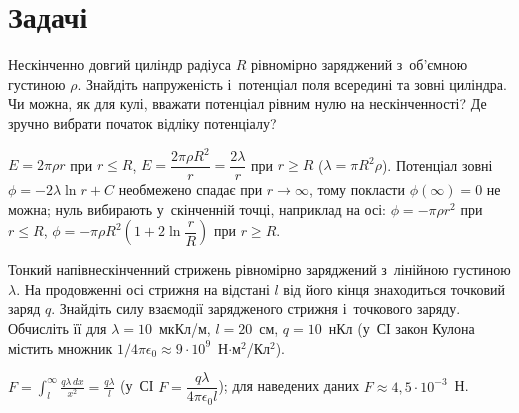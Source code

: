 \section*{Задачі}



 {}


\begin{problem}\label{prb:CylinderPotential}%
	Нескінченно довгий циліндр радіуса $R$ рівномірно заряджений з~об'ємною густиною
	$\rho$. Знайдіть напруженість і~потенціал поля всередині та зовні циліндра. Чи можна,
	як для кулі, вважати потенціал рівним нулю на нескінченності? Де зручно вибрати
	початок відліку потенціалу?
	\begin{solution}
		$E = 2\pi\rho r$ при $r\leqslant R$, $E = \dfrac{2\pi\rho R^2}{r} = \dfrac{2\lambda}{r}$ при $r\geqslant R$ ($\lambda=\pi R^2\rho$). Потенціал зовні $\phi = -2\lambda\ln r + C$ необмежено спадає при $r\to\infty$, тому покласти $\phi(\infty)=0$ не можна; нуль вибирають у~скінченній точці, наприклад на осі: $\phi = -\pi\rho r^2$ при $r\leqslant R$, $\phi = -\pi\rho R^2\left(1 + 2\ln\dfrac{r}{R}\right)$ при $r\geqslant R$.
	\end{solution}
\end{problem}


\begin{problem}%
	Тонкий напівнескінченний стрижень рівномірно заряджений з~лінійною густиною $\lambda$. На
	продовженні осі стрижня на відстані $l$ від його кінця знаходиться точковий заряд $q$.
	Знайдіть силу взаємодії зарядженого стрижня і~точкового заряду. Обчисліть її для
	$\lambda = 10$~мкКл/м, $l = 20$~см, $q = 10$~нКл (у~СІ закон Кулона містить множник
	$1/4\pi\epsilon_0 \approx 9\cdot10^{9}$~Н$\cdot$м$^2$/Кл$^2$).
	\begin{solution}
		$F=\displaystyle\int_l^\infty\frac{q\lambda\,dx}{x^2}=\frac{q\lambda}{l}$ (у~СІ $F=\dfrac{q\lambda}{4\pi\epsilon_0 l}$); для наведених даних $F\approx4{,}5\cdot10^{-3}$~Н.
	\end{solution}
\end{problem}

